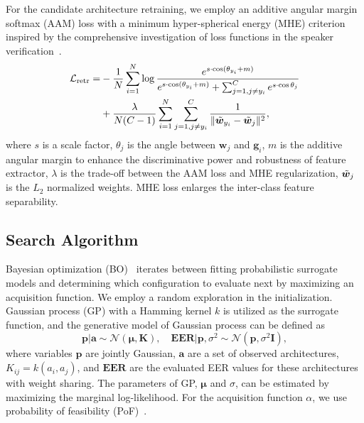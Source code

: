 \documentclass{article}
\begin{document}
For the candidate architecture retraining, we employ an additive angular margin softmax (AAM) loss with a minimum hyper-spherical energy (MHE) criterion inspired by the comprehensive investigation of loss functions in the speaker verification~\cite{liu2019large}.  \begin{gather}
    \begin{aligned}
    \mathcal{L}_{\text{retr}} = &-\frac{1}{N} \sum_{i=1}^{N} \log \frac{e^{s \cdot \cos(\theta_{y_i} + m)}}{e^{s \cdot \cos(\theta_{y_i} + m)} + \sum_{j=1, j\neq y_i}^{C} e^{s \cdot \cos \theta_j} } \\
    &+ \frac{\lambda}{N(C-1)}\sum_{i=1}^{N} \sum_{j=1, j\neq y_i}^{C}\frac{1}{\| \Tilde{\bm{w}}_{y_i} - \Tilde{\bm{w}}_{j} \|^2},
    \end{aligned}\label{eq:retrain}
\end{gather}
where $s$ is a scale factor, $\theta_j$ is the angle between $\bm{w}_j$ and $\bm{g}_i$, $m$ is the additive angular margin to enhance the discriminative power and robustness of feature extractor, $\lambda$ is the trade-off between the AAM loss and MHE regularization, $\Tilde{\bm{w}}_{j}$ is the $L_2$ normalized weights. MHE loss enlarges the inter-class feature separability.
\subsection{Search Algorithm}\label{sec:search_algorithm}
Bayesian optimization (BO)~\cite{shahriari2015taking} iterates between fitting probabilistic surrogate models and determining which configuration to evaluate next by maximizing an acquisition function. We employ a random exploration in the initialization. Gaussian process (GP) with a Hamming kernel $k$ is utilized as the surrogate function, and the generative model of Gaussian process can be defined as
\begin{equation}
    \bm{p} | \bm{a} \sim \mathcal{N}(\bm{\mu}, \bm{K}), \quad \textbf{EER} | \bm{p}, {\sigma}^2 \sim \mathcal{N}(\bm{p}, \sigma^2 \bm{I}),\label{eq:gp}
\end{equation}
where variables $\bm{p}$ are jointly Gaussian, $\bm{a}$ are a set of observed architectures, $K_{ij} = k(a_i, a_j)$, and $\textbf{EER}$ are the evaluated EER values for these architectures with weight sharing. The parameters of GP, $\bm{\mu}$ and $\sigma$, can be estimated by maximizing the marginal log-likelihood. For the acquisition function $\alpha$, we use probability of feasibility (PoF)~\cite{gardner2014bayesian}. 
\end{document}
